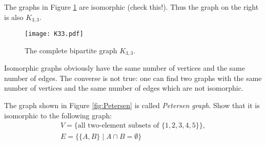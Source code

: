 \begin{page}
\setcounter{section}{1}
\setcounter{subsection}{3}
\setcounter{dfn}{4}
\label{portion:154}

\begin{exl}
The graphs in Figure \ref{fig:K33} are isomorphic (check this!).
Thus the graph on the right is also $K_{3,3}$.
\end{exl}

\end{page}

\begin{page}
\setcounter{section}{1}
\setcounter{subsection}{3}
\setcounter{dfn}{4}
\label{portion:155}


\begin{figure}[ht]
\begin{center}
\texttt{[image: K33.pdf]}
\end{center}
\caption{The complete bipartite graph $K_{3,3}$.}
\label{fig:K33}
\end{figure}


\end{page}

\begin{page}
\setcounter{section}{1}
\setcounter{subsection}{3}
\setcounter{dfn}{5}
\label{portion:157}

\begin{rem}
Isomorphic graphs obviously have the same number of vertices and the same number of edges.
The converse is not true: one can find two graphs with the same number of vertices and the same number of edges
which are not isomorphic.
\end{rem}

\end{page}

\begin{page}
\setcounter{section}{1}
\setcounter{subsection}{3}
\setcounter{dfn}{6}
\label{portion:160}

\begin{exc}
The graph shown in Figure \ref{fig:Petersen} is called \emph{Petersen graph}.
Show that it is isomorphic to the following graph:
\begin{gather*}
V = \{\text{all two-element subsets of }\{1, 2, 3, 4, 5\}\},\\
E = \{\{A, B\} \mid A \cap B = \emptyset\}
\end{gather*}
\end{exc}

\end{page}

